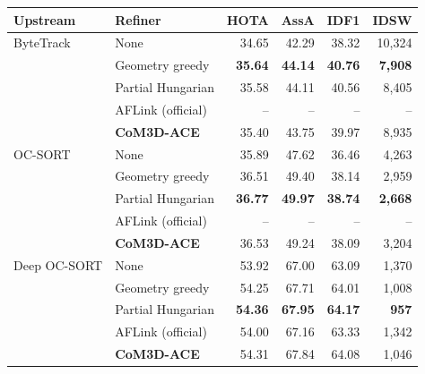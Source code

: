 \begin{tabular}{llrrrr}
\toprule
Upstream & Refiner & HOTA & AssA & IDF1 & IDSW \\
\midrule
ByteTrack & None & 34.65 & 42.29 & 38.32 & 10,324 \\
 & Geometry greedy & \textbf{35.64} & \textbf{44.14} & \textbf{40.76} & \textbf{7,908} \\
 & Partial Hungarian & 35.58 & 44.11 & 40.56 & 8,405 \\
 & AFLink (official) & -- & -- & -- & -- \\
 & \textbf{CoM3D-ACE} & 35.40 & 43.75 & 39.97 & 8,935 \\
\midrule
OC-SORT & None & 35.89 & 47.62 & 36.46 & 4,263 \\
 & Geometry greedy & 36.51 & 49.40 & 38.14 & 2,959 \\
 & Partial Hungarian & \textbf{36.77} & \textbf{49.97} & \textbf{38.74} & \textbf{2,668} \\
 & AFLink (official) & -- & -- & -- & -- \\
 & \textbf{CoM3D-ACE} & 36.53 & 49.24 & 38.09 & 3,204 \\
\midrule
Deep OC-SORT & None & 53.92 & 67.00 & 63.09 & 1,370 \\
 & Geometry greedy & 54.25 & 67.71 & 64.01 & 1,008 \\
 & Partial Hungarian & \textbf{54.36} & \textbf{67.95} & \textbf{64.17} & \textbf{957} \\
 & AFLink (official) & 54.00 & 67.16 & 63.33 & 1,342 \\
 & \textbf{CoM3D-ACE} & 54.31 & 67.84 & 64.08 & 1,046 \\
\bottomrule
\end{tabular}
